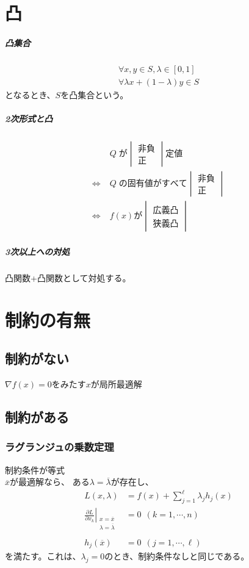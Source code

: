\documentclass[twocolumn]{ltjsarticle}
\newcommand{\subans}[2]{
    \begin{vmatrix}
        \mathrm{#1}\\
        \mathrm{#2}
    \end{vmatrix}
}
\begin{document}
\section{凸}
\subparagraph{凸集合}
\begin{align*}
    \forall x,y\in S,\lambda\in[0,1]\\
    \forall \lambda x+(1-\lambda)y\in S
\end{align*}
となるとき、$S$を凸集合という。
\subparagraph{2次形式と凸}
\begin{align*}
    &Q\;\mathrm{が\subans{非負}{正}定値}\\
    \Leftrightarrow\; &Q\;\mathrm{の固有値がすべて\subans{非負}{正}}\\
    \Leftrightarrow\; &f(x)\mathrm{が\subans{広義凸}{狭義凸}}
\end{align*}
\subparagraph{3次以上への対処}
凸関数+凸関数として対処する。

\section{制約の有無}
\noindent
\subsection{制約がない}
$\nabla f(x)=0$をみたす$x$が局所最適解
\subsection{制約がある}
\subsubsection{ラグランジュの乗数定理}
\rightarrow 制約条件が等式\\
$\overline{x}$が最適解なら、
ある$\lambda=\overline{\lambda}$が存在し、
\begin{align*}
    L(x,\lambda)&=f(x)+\sum_{j=1}^{\ell}\lambda_jh_j(x)\\
    \left. \frac{\partial L}{\partial x_k} \right|_{
        \begin{matrix}
            x=\overline{x}\\
            \lambda=\overline{\lambda}
        \end{matrix}
        }
    &=0\ \ (k=1,\cdots,n)\\\\
    h_j(\overline{x})&=0\ \ (j=1,\cdots,\ell)
\end{align*}
を満たす。これは、$\lambda_j=0$のとき、制約条件なしと同じである。
\end{document}
